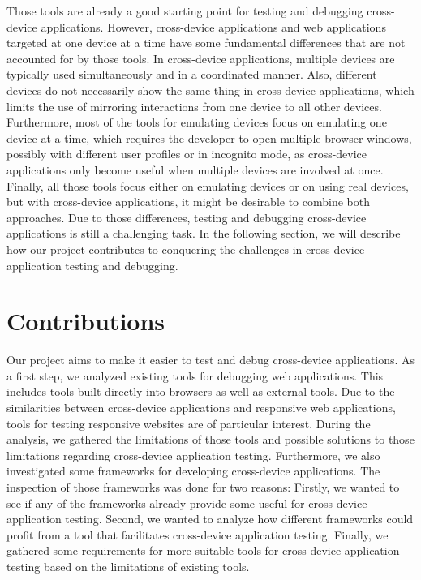 Those tools are already a good starting point for testing and debugging cross-device applications. However, cross-device applications and web applications targeted at one device at a time have some fundamental differences that are not accounted for by those tools. In cross-device applications, multiple devices are typically used simultaneously and in a coordinated manner. Also, different devices do not necessarily show the same thing in cross-device applications, which limits the use of mirroring interactions from one device to all other devices. Furthermore, most of the tools for emulating devices focus on emulating one device at a time, which requires the developer to open multiple browser windows, possibly with different user profiles or in incognito mode, as cross-device applications only become useful when multiple devices are involved at once. Finally, all those tools focus either on emulating devices or on using real devices, but with cross-device applications, it might be desirable to combine both approaches. Due to those differences, testing and debugging cross-device applications is still a challenging task. In the following section, we will describe how our project contributes to conquering the challenges in cross-device application testing and debugging.

\section{Contributions}

Our project aims to make it easier to test and debug cross-device applications. As a first step, we analyzed existing tools for debugging web applications. This includes tools built directly into browsers as well as external tools. Due to the similarities between cross-device applications and responsive web applications, tools for testing responsive websites are of particular interest. During the analysis, we gathered the limitations of those tools and possible solutions to those limitations regarding cross-device application testing. Furthermore, we also investigated some frameworks for developing cross-device applications. The inspection of those frameworks was done for two reasons: Firstly, we wanted to see if any of the frameworks already provide some useful for cross-device application testing. Second, we wanted to analyze how different frameworks could profit from a tool that facilitates cross-device application testing. Finally, we gathered some requirements for more suitable tools for cross-device application testing based on the limitations of existing tools.

